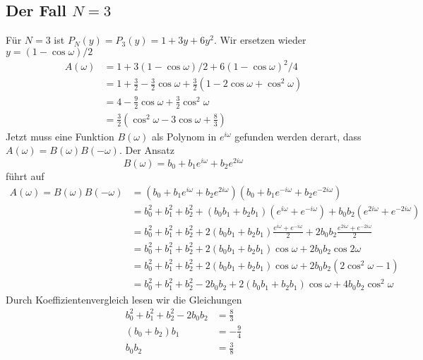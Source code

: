 \subsection{Der Fall $N=3$}
Für $N=3$ ist $P_N(y)=P_3(y)=1+3y+6y^2$.
Wir ersetzen wieder $y=(1-\cos\omega)/2$ 
\begin{align*}
A(\omega)
&=
1+3(1-\cos\omega)/2 + 6(1-\cos\omega)^2/4
\\
&=
1+\frac32-\frac32\cos\omega
+
\frac32(1-2\cos\omega+\cos^2\omega)
\\
&=
4
-
\frac92\cos\omega
+
\frac32\cos^2\omega
\\
&=
\frac32(\cos^2\omega -3\cos\omega + \frac{8}3)
\end{align*}
Jetzt muss eine Funktion $B(\omega)$ als Polynom in $e^{i\omega}$
gefunden werden derart, dass $A(\omega)=B(\omega)B(-\omega)$.
Der Ansatz
\[
B(\omega)
=
b_0 + b_1 e^{i\omega} + b_2 e^{2i\omega}
\]
führt auf
\begin{align*}
A(\omega)
=
B(\omega)B(-\omega)
&=
(b_0 + b_1 e^{i\omega} + b_2 e^{2i\omega})
(b_0 + b_1 e^{-i\omega} + b_2 e^{-2i\omega})
\\
&=
b_0^2 + b_1^2 + b_2^2
+
(b_0b_1 + b_2b_1)
(e^{i\omega}+e^{-i\omega})
+
b_0b_2
(e^{2i\omega}+e^{-2i\omega})
\\
&=
b_0^2 + b_1^2 + b_2^2
+
2(b_0b_1 + b_2b_1)
\frac{e^{i\omega}+e^{-i\omega}}2
+
2b_0b_2
\frac{e^{2i\omega}+e^{-2i\omega}}2
\\
&=
b_0^2 + b_1^2 + b_2^2
+
2(b_0b_1 + b_2b_1)
\cos\omega
+
2b_0b_2
\cos 2\omega
\\
&=
b_0^2 + b_1^2 + b_2^2
+
2(b_0b_1 + b_2b_1)
\cos\omega
+
2b_0b_2
(2\cos^2\omega-1)
\\
&=
b_0^2 + b_1^2 + b_2^2 -2b_0b_2
+
2(b_0b_1 + b_2b_1)
\cos\omega
+
4b_0b_2
\cos^2\omega
\end{align*}
Durch Koeffizientenvergleich lesen wir die Gleichungen
\begin{align*}
b_0^2+b_1^2+b_2^2-2b_0b_2&=\frac83
\\
(b_0+b_2)b_1 &= -\frac94
\\
b_0b_2
&=
\frac{3}{8}
\end{align*}



